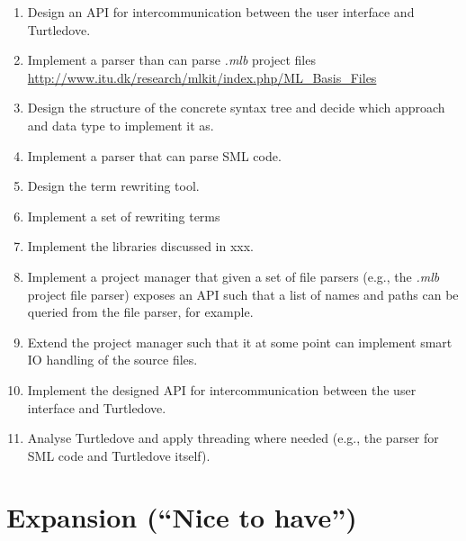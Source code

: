 \documentclass[a4paper,oneside]{article}
\begin{document}
\begin{enumerate}

\item Design an API for intercommunication between the user interface and
  Turtledove.

\item Implement a parser than can parse \textit{.mlb} project files
  \url{http://www.itu.dk/research/mlkit/index.php/ML_Basis_Files}

\item Design the structure of the concrete syntax tree and decide which approach
  and data type to implement it as.

\item Implement a parser that can parse SML code.

\item Design the term rewriting tool.

\item Implement a set of rewriting terms

\item Implement the libraries discussed in xxx. 

\item Implement a project manager that given a set of file parsers (e.g., the \textit{.mlb} project file
  parser) exposes an API such that a list of names and paths can be queried from
  the file parser, for example.

\item Extend the project manager such that it at some point can implement smart
  IO handling of the source files.

\item Implement the designed API for intercommunication between the user
  interface and Turtledove.

\item Analyse Turtledove and apply threading where needed (e.g., the parser for
  SML code and Turtledove itself).

\end{enumerate}


\section{Expansion (``Nice to have'')}

\end{document}
